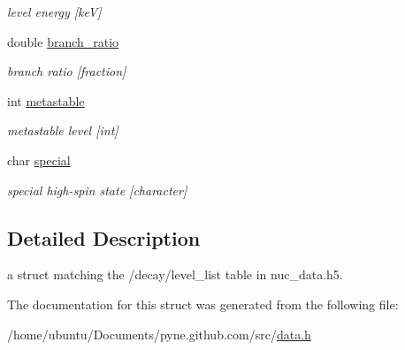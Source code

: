 \begin{DoxyCompactItemize}
\begin{DoxyCompactList}\small\item\em level energy \mbox{[}keV\mbox{]} \end{DoxyCompactList}\item 
double \hyperlink{structpyne_1_1level__data_a5ce97c540e0ce558156e5a43510a4633}{branch\+\_\+ratio}\hypertarget{structpyne_1_1level__data_a5ce97c540e0ce558156e5a43510a4633}{}\label{structpyne_1_1level__data_a5ce97c540e0ce558156e5a43510a4633}

\begin{DoxyCompactList}\small\item\em branch ratio \mbox{[}fraction\mbox{]} \end{DoxyCompactList}\item 
int \hyperlink{structpyne_1_1level__data_a7a71068eed39597f007cc6624727e954}{metastable}\hypertarget{structpyne_1_1level__data_a7a71068eed39597f007cc6624727e954}{}\label{structpyne_1_1level__data_a7a71068eed39597f007cc6624727e954}

\begin{DoxyCompactList}\small\item\em metastable level \mbox{[}int\mbox{]} \end{DoxyCompactList}\item 
char \hyperlink{structpyne_1_1level__data_acabc31aa71741dbc2ea5485ca51da0d6}{special}\hypertarget{structpyne_1_1level__data_acabc31aa71741dbc2ea5485ca51da0d6}{}\label{structpyne_1_1level__data_acabc31aa71741dbc2ea5485ca51da0d6}

\begin{DoxyCompactList}\small\item\em special high-\/spin state \mbox{[}character\mbox{]} \end{DoxyCompactList}\end{DoxyCompactItemize}


\subsection{Detailed Description}
a struct matching the \textquotesingle{}/decay/level\+\_\+list\textquotesingle{} table in nuc\+\_\+data.\+h5. 

The documentation for this struct was generated from the following file\+:\begin{DoxyCompactItemize}
\item 
/home/ubuntu/\+Documents/pyne.\+github.\+com/src/\hyperlink{data_8h}{data.\+h}\end{DoxyCompactItemize}
